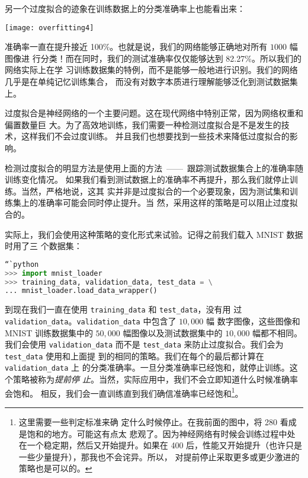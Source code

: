 另一个过度拟合的迹象在训练数据上的分类准确率上也能看出来：
\begin{center}
  \texttt{[image: overfitting4]}
\end{center}

准确率一直在提升接近 100\%。也就是说，我们的网络能够正确地对所有 $1000$ 幅图像进
行分类！而在同时，我们的测试准确率仅仅能够达到 82.27\%。所以我们的网络实际上在学
习训练数据集的特例，而不是能够一般地进行识别。我们的网络几乎是在单纯记忆训练集合，
而没有对数字本质进行理解能够泛化到测试数据集上。

过度拟合是神经网络的一个主要问题。这在现代网络中特别正常，因为网络权重和偏置数量巨
大。为了高效地训练，我们需要一种检测过度拟合是不是发生的技术，这样我们不会过度训练。
并且我们也想要找到一些技术来降低过度拟合的影响。

检测过度拟合的明显方法是使用上面的方法~——~跟踪测试数据集合上的准确率随训练变化情况。
如果我们看到测试数据上的准确率不再提升，那么我们就停止训练。当然，严格地说，这其
实并非是过度拟合的一个必要现象，因为测试集和训练集上的准确率可能会同时停止提升。当
然，采用这样的策略是可以阻止过度拟合的。

实际上，我们会使用这种策略的变化形式来试验。记得之前我们载入 MNIST 数据时用了三
个数据集：

\begin{lstlisting}[language=Python]
“`python
>>> import mnist_loader
>>> training_data, validation_data, test_data = \
... mnist_loader.load_data_wrapper()
\end{lstlisting}

到现在我们一直在使用 \lstinline!training_data! 和 \lstinline!test_data!，没有用
过 \lstinline!validation_data!。\lstinline!validation_data! 中包含了 $10,000$ 幅
数字图像，这些图像和 MNIST 训练数据集中的 $50,000$ 幅图像以及测试数据集中的
$10,000$ 幅都不相同。我们会使用 \lstinline!validation_data! 而不是
\lstinline!test_data! 来防止过度拟合。我们会为 \lstinline!test_data! 使用和上面提
到的相同的策略。我们在每个\epoch{}的最后都计算在 \lstinline!validation_data! 上
的分类准确率。一旦分类准确率已经饱和，就停止训练。这个策略被称为\emph{提前停
  止}。当然，实际应用中，我们不会立即知道什么时候准确率会饱和。
相反，我们会一直训练直到我们确信准确率已经饱和\footnote{这里需要一些判定标准来确
  定什么时候停止。在我前面的图中，将 280 \epoch{}看成是饱和的地方。可能这有点太
  悲观了。因为神经网络有时候会训练过程中处在一个稳定期，然后又开始提升。如果在
  400 \epoch{}后，性能又开始提升（也许只是一些少量提升），那我也不会诧异。所以，
  对提前停止采取更多或更少激进的策略也是可以的。}。

